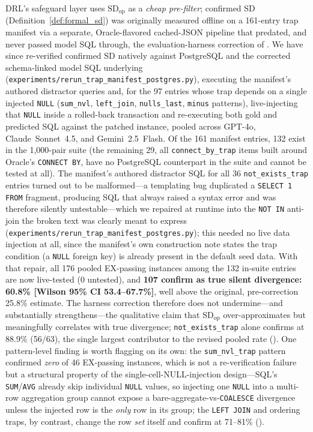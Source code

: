 \documentclass[twocolumn]{svjour3}
\begin{document}
DRL's safeguard layer uses $\text{SD}_{\text{op}}$ as a \emph{cheap pre-filter}; confirmed SD (Definition~\ref{def:formal_sd}) was originally measured offline on a 161-entry trap manifest via a separate, Oracle-flavored cached-JSON pipeline that predated, and never passed model SQL through, the evaluation-harness correction of .
We have since re-verified confirmed SD natively against PostgreSQL and the corrected schema-linked model SQL underlying  (\texttt{experiments/rerun\_trap\_manifest\_postgres.py}), executing the manifest's authored distractor queries and, for the 97 entries whose trap depends on a single injected \texttt{NULL} (\texttt{sum\_nvl}, \texttt{left\_join}, \texttt{nulls\_last}, \texttt{minus} patterns), live-injecting that \texttt{NULL} inside a rolled-back transaction and re-executing both gold and predicted SQL against the patched instance, pooled across GPT-4o, Claude~Sonnet~4.5, and Gemini~2.5~Flash.
Of the 161 manifest entries, 132 exist in the 1{,}000-pair suite (the remaining 29, all \texttt{connect\_by\_trap} items built around Oracle's \texttt{CONNECT BY}, have no PostgreSQL counterpart in the suite and cannot be tested at all).
The manifest's authored distractor SQL for all 36 \texttt{not\_exists\_trap} entries turned out to be malformed---a templating bug duplicated a \texttt{SELECT 1 FROM} fragment, producing SQL that always raised a syntax error and was therefore silently untestable---which we repaired at runtime into the \texttt{NOT IN} anti-join the broken text was clearly meant to express (\texttt{experiments/rerun\_trap\_manifest\_postgres.py}); this needed no live data injection at all, since the manifest's own construction note states the trap condition (a \texttt{NULL} foreign key) is already present in the default seed data.
With that repair, all 176 pooled EX-passing instances among the 132 in-suite entries are now live-tested (0 untested), and \textbf{107 confirm as true silent divergence: 60.8\% [Wilson 95\% CI 53.4--67.7\%]}, well above the original, pre-correction 25.8\% estimate.
The harness correction therefore does not undermine---and substantially strengthens---the qualitative claim that $\text{SD}_{\text{op}}$ over-approximates but meaningfully correlates with true divergence; \texttt{not\_exists\_trap} alone confirms at 88.9\% (56/63), the single largest contributor to the revised pooled rate ().
One pattern-level finding is worth flagging on its own: the \texttt{sum\_nvl\_trap} pattern confirmed \emph{zero} of 46 EX-passing instances, which is not a re-verification failure but a structural property of the single-cell-NULL-injection design---SQL's \texttt{SUM}/\texttt{AVG} already skip individual \texttt{NULL} values, so injecting one \texttt{NULL} into a multi-row aggregation group cannot expose a bare-aggregate-vs-\texttt{COALESCE} divergence unless the injected row is the \emph{only} row in its group; the \texttt{LEFT JOIN} and ordering traps, by contrast, change the row \emph{set} itself and confirm at 71--81\% ().
\end{document}
